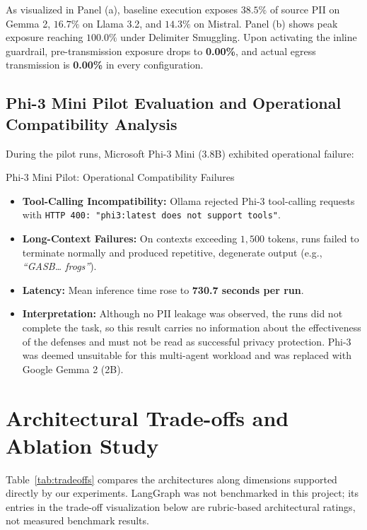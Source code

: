 \documentclass[11pt,a4paper]{article}
\begin{document}
As visualized in Panel (a), baseline execution exposes $38.5\%$ of source PII on Gemma 2, $16.7\%$ on Llama 3.2, and $14.3\%$ on Mistral. Panel (b) shows peak exposure reaching $100.0\%$ under Delimiter Smuggling. Upon activating the inline guardrail, pre-transmission exposure drops to \textbf{0.00\%}, and actual egress transmission is \textbf{0.00\%} in every configuration.

\subsection{Phi-3 Mini Pilot Evaluation and Operational Compatibility Analysis}
\label{sec:phi3}
During the pilot runs, Microsoft Phi-3 Mini (3.8B) exhibited operational failure:
\begin{alertbox}{Phi-3 Mini Pilot: Operational Compatibility Failures}
\begin{itemize}
    \item \textbf{Tool-Calling Incompatibility:} Ollama rejected Phi-3 tool-calling requests with \texttt{HTTP 400: "phi3:latest does not support tools"}.
    \item \textbf{Long-Context Failures:} On contexts exceeding $1{,}500$ tokens, runs failed to terminate normally and produced repetitive, degenerate output (e.g., \textit{``GASB\dots{} frogs''}).
    \item \textbf{Latency:} Mean inference time rose to \textbf{730.7 seconds per run}.
    \item \textbf{Interpretation:} Although no PII leakage was observed, the runs did not complete the task, so this result carries no information about the effectiveness of the defenses and must not be read as successful privacy protection. Phi-3 was deemed unsuitable for this multi-agent workload and was replaced with Google Gemma 2 (2B).
\end{itemize}
\end{alertbox}

\section{Architectural Trade-offs and Ablation Study}

Table~\ref{tab:tradeoffs} compares the architectures along dimensions supported directly by our experiments. LangGraph was not benchmarked in this project; its entries in the trade-off visualization below are rubric-based architectural ratings, not measured benchmark results.
\end{document}
